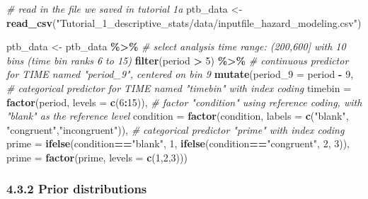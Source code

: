 \documentclass[
  man, donotrepeattitle,floatsintext]{apa6}
\newenvironment{Shaded}{\begin{snugshade}}{\end{snugshade}}
\newcommand{\AttributeTok}[1]{\textcolor[rgb]{0.13,0.29,0.53}{#1}}
\newcommand{\CommentTok}[1]{\textcolor[rgb]{0.56,0.35,0.01}{\textit{#1}}}
\newcommand{\DecValTok}[1]{\textcolor[rgb]{0.00,0.00,0.81}{#1}}
\newcommand{\FunctionTok}[1]{\textcolor[rgb]{0.13,0.29,0.53}{\textbf{#1}}}
\newcommand{\NormalTok}[1]{#1}
\newcommand{\OtherTok}[1]{\textcolor[rgb]{0.56,0.35,0.01}{#1}}
\newcommand{\SpecialCharTok}[1]{\textcolor[rgb]{0.81,0.36,0.00}{\textbf{#1}}}
\newcommand{\StringTok}[1]{\textcolor[rgb]{0.31,0.60,0.02}{#1}}
\begin{document}
\begin{Shaded}
\begin{Highlighting}[]
\CommentTok{\# read in the file we saved in tutorial 1a}
\NormalTok{ptb\_data }\OtherTok{\textless{}{-}} \FunctionTok{read\_csv}\NormalTok{(}\StringTok{"Tutorial\_1\_descriptive\_stats/data/inputfile\_hazard\_modeling.csv"}\NormalTok{)}

\NormalTok{ptb\_data }\OtherTok{\textless{}{-}}\NormalTok{ ptb\_data }\SpecialCharTok{\%\textgreater{}\%} 
\CommentTok{\# select analysis time range: (200,600] with 10 bins (time bin ranks 6 to 15)}
\FunctionTok{filter}\NormalTok{(period }\SpecialCharTok{\textgreater{}} \DecValTok{5}\NormalTok{) }\SpecialCharTok{\%\textgreater{}\%}
       \CommentTok{\# continuous predictor for TIME named "period\_9", centered on bin 9}
\FunctionTok{mutate}\NormalTok{(}\AttributeTok{period\_9 =}\NormalTok{ period }\SpecialCharTok{{-}} \DecValTok{9}\NormalTok{,}
       \CommentTok{\# categorical predictor for TIME named "timebin" with index coding}
       \AttributeTok{timebin =} \FunctionTok{factor}\NormalTok{(period, }\AttributeTok{levels =} \FunctionTok{c}\NormalTok{(}\DecValTok{6}\SpecialCharTok{:}\DecValTok{15}\NormalTok{)),}
       \CommentTok{\# factor "condition" using reference coding, with "blank" as the reference level}
       \AttributeTok{condition =} \FunctionTok{factor}\NormalTok{(condition, }\AttributeTok{labels =} \FunctionTok{c}\NormalTok{(}\StringTok{"blank"}\NormalTok{, }\StringTok{"congruent"}\NormalTok{,}\StringTok{"incongruent"}\NormalTok{)),}
       \CommentTok{\# categorical predictor "prime" with index coding}
       \AttributeTok{prime =} \FunctionTok{ifelse}\NormalTok{(condition}\SpecialCharTok{==}\StringTok{"blank"}\NormalTok{, }\DecValTok{1}\NormalTok{, }\FunctionTok{ifelse}\NormalTok{(condition}\SpecialCharTok{==}\StringTok{"congruent"}\NormalTok{, }\DecValTok{2}\NormalTok{, }\DecValTok{3}\NormalTok{)),}
       \AttributeTok{prime =} \FunctionTok{factor}\NormalTok{(prime, }\AttributeTok{levels =} \FunctionTok{c}\NormalTok{(}\DecValTok{1}\NormalTok{,}\DecValTok{2}\NormalTok{,}\DecValTok{3}\NormalTok{)))}
\end{Highlighting}
\end{Shaded}

\normalsize

\subsubsection{4.3.2 Prior distributions}\label{prior-distributions}
\end{document}

